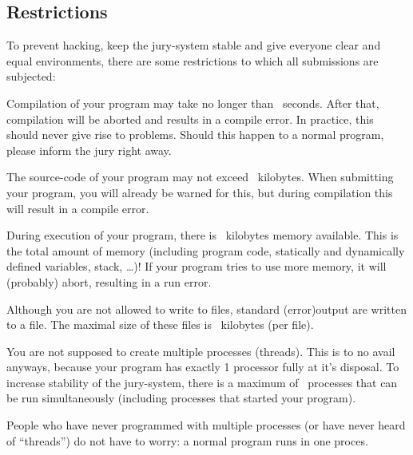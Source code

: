 \documentclass[11pt,a4paper]{article}
\begin{document}
\subsection{Restrictions}\label{runlimits}

To prevent hacking, keep the jury-system stable and give everyone
clear and equal environments, there are some restrictions to which all
submissions are subjected:

\begin{description}
\item[compile time]
Compilation of your program may take no longer than \COMPILETIME\
seconds. After that, compilation will be aborted and results in a
compile error. In practice, this should never give rise to
problems. Should this happen to a normal program, please inform the
jury right away.

\item[source size]
The source-code of your program may not exceed \SOURCESIZE\ kilobytes.
When submitting your program, you will already be warned for this, but
during compilation this will result in a compile error.

\item[memory]
During execution of your program, there is \MEMLIMIT\ kilobytes memory
available. This is the total amount of memory (including program code,
statically and dynamically defined variables, stack, \dots)! If your
program tries to use more memory, it will (probably) abort, resulting
in a run error.

\item[filesize]
Although you are not allowed to write to files, standard (error)output
are written to a file. The maximal size of these files is \FILELIMIT\
kilobytes (per file).

\item[number of processes]
You are not supposed to create multiple processes (threads). This is
to no avail anyways, because your program has exactly 1 processor fully
at it's disposal. To increase stability of the jury-system, there is a
maximum of \PROCLIMIT\ processes that can be run simultaneously
(including processes that started your program).

People who have never programmed with multiple processes (or have
never heard of ``threads'') do not have to worry: a normal program
runs in one proces.

\end{description}
\end{document}
